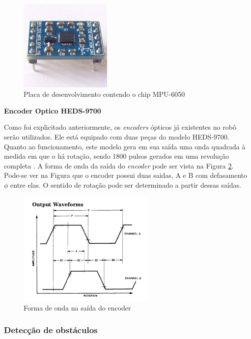 \begin{figure}[H]
\centering
\includegraphics[width=0.4\textwidth]{./figuras/mpu6050.JPG}
\caption{Placa de desenvolvimento contendo o chip MPU-6050}
\label{fig:mpu6050}
\end{figure}

\textbf{Encoder Optico HEDS-9700}

Como foi explicitado anteriormente, os \textit{encoders} ópticos já existentes no robô serão utilizados. Ele está equipado com duas peças do modelo HEDS-9700.
Quanto ao funcionamento, este modelo gera em sua saída uma onda quadrada à medida em que o há rotação, sendo 1800 pulsos gerados em uma revolução completa \cite{heds9700}. A forma de onda da saída do \textit{encoder} pode ser vista na Figura \ref{fig:heds9700}. Pode-se ver na Figura que o encoder possui duas saidas, A e B com defasamento $\phi$ entre elas. O sentido de rotação pode ser determinado a partir dessas saídas.

\begin{figure}[H]
\centering
\includegraphics[width=0.6\textwidth]{./figuras/heds9700.png}
\caption{Forma de onda na saída do encoder}
\label{fig:heds9700}
\end{figure}

\subsubsection{Detecção de obstáculos}

